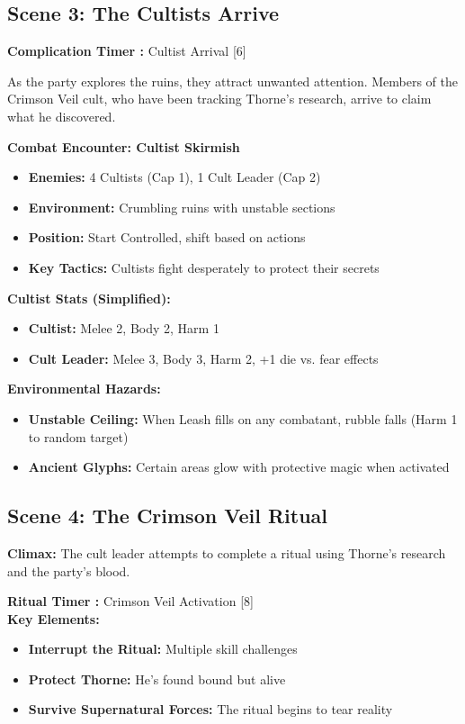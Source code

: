 \documentclass[11pt]{article}
\begin{document}
\subsection*{Scene 3: The Cultists Arrive}
\textbf{Complication Timer :} Cultist Arrival [6]

As the party explores the ruins, they attract unwanted attention. Members of the Crimson Veil cult, who have been tracking Thorne's research, arrive to claim what he discovered.

\textbf{Combat Encounter: Cultist Skirmish}
\begin{itemize}[leftmargin=*]
\item \textbf{Enemies:} 4 Cultists (Cap 1), 1 Cult Leader (Cap 2)
\item \textbf{Environment:} Crumbling ruins with unstable sections
\item \textbf{Position:} Start Controlled, shift based on actions
\item \textbf{Key Tactics:} Cultists fight desperately to protect their secrets
\end{itemize}

\textbf{Cultist Stats (Simplified):}
\begin{itemize}[leftmargin=*]
\item \textbf{Cultist:} Melee 2, Body 2, Harm 1
\item \textbf{Cult Leader:} Melee 3, Body 3, Harm 2, +1 die vs. fear effects
\end{itemize}

\textbf{Environmental Hazards:}
\begin{itemize}[leftmargin=*]
\item \textbf{Unstable Ceiling:} When Leash fills on any combatant, rubble falls (Harm 1 to random target)
\item \textbf{Ancient Glyphs:} Certain areas glow with protective magic when activated
\end{itemize}

\subsection*{Scene 4: The Crimson Veil Ritual}
\textbf{Climax:} The cult leader attempts to complete a ritual using Thorne's research and the party's blood.

\textbf{Ritual Timer :} Crimson Veil Activation [8]\\
\textbf{Key Elements:}
\begin{itemize}[leftmargin=*]
\item \textbf{Interrupt the Ritual:} Multiple skill challenges
\item \textbf{Protect Thorne:} He's found bound but alive
\item \textbf{Survive Supernatural Forces:} The ritual begins to tear reality
\end{itemize}
\end{document}
